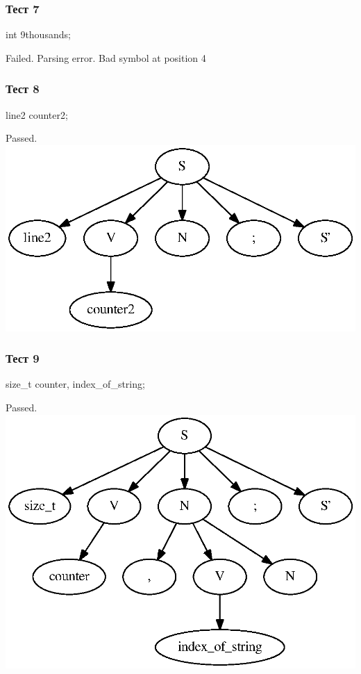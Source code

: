 \subsubsection{Тест 7}
int 9thousands;

Failed.
Parsing error. Bad symbol at position 4

\subsubsection{Тест 8}
line2 counter2;

Passed.
\includegraphics[width=\textwidth]{graph8.eps}

\subsubsection{Тест 9}
size\_t counter, index\_of\_string;

Passed.
\includegraphics[width=\textwidth]{graph9.eps}


